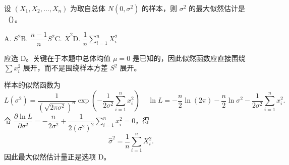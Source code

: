 ﻿\documentclass[lang=cn,11pt]{elegantbook}
\begin{document}
\begin{exercise}\label{exer:7-normal-sigma2}
设 \((X_1, X_2, \dots, X_n)\) 为取自总体 \(N(0, \sigma^2)\) 的样本，则 \(\sigma^2\) 的最大似然估计是（\quad）。\par
A. \(S^2\)\qquad B. \(\dfrac{n-1}{n}S^2\)\qquad C. \(\overline{X}^2\)\qquad D. \(\dfrac{1}{n}\displaystyle\sum_{i=1}^{n}X_i^2\)
\end{exercise}
\begin{solution}
应选 D。关键在于本题中总体均值 \(\mu=0\) 是已知的，因此似然函数应直接围绕 \(\sum x_i^2\) 展开，而不是围绕样本方差 \(S^2\) 展开。

样本的似然函数为
\[
L(\sigma^2) = \frac{1}{(\sqrt{2\pi\sigma^2})^n}\exp\!\left(-\frac{1}{2\sigma^2}\sum_{i=1}^{n}x_i^2\right)~~~~~
\ln L = -\frac{n}{2}\ln(2\pi) - \frac{n}{2}\ln\sigma^2 - \frac{1}{2\sigma^2}\sum_{i=1}^{n}x_i^2.
\]
令 \(\dfrac{\partial\ln L}{\partial\sigma^2} = -\dfrac{n}{2\sigma^2} + \dfrac{1}{2(\sigma^2)^2}\displaystyle\sum_{i=1}^{n}x_i^2 = 0\)，得
\[
\hat{\sigma}^2 = \frac{1}{n}\sum_{i=1}^{n}X_i^2.
\]
因此最大似然估计量正是选项 D。
\end{solution}
\end{document}
